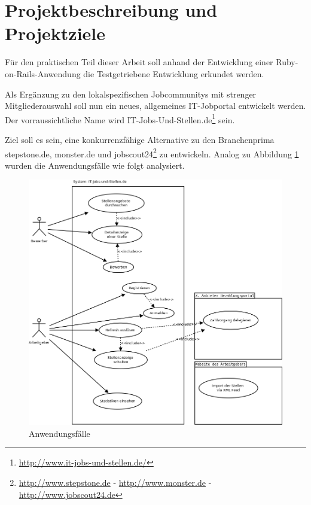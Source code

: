 \section{Projektbeschreibung und Projektziele}
Für den praktischen Teil dieser Arbeit soll anhand der Entwicklung einer Ruby-on-Rails-Anwendung die Testgetriebene Entwicklung erkundet werden.

Als Ergänzung zu den lokalspezifischen Jobcommunitys mit strenger Mitgliederauswahl soll nun ein neues, allgemeines IT-Jobportal entwickelt werden. Der vorraussichtliche Name wird IT-Jobs-Und-Stellen.de\footnote{\url{http://www.it-jobs-und-stellen.de/}} sein.

Ziel soll es sein, eine konkurrenzfähige Alternative zu den Branchenprima stepstone.de, monster.de und jobscout24\footnote{\url{http://www.stepstone.de} - \url{http://www.monster.de} - \url{http://www.jobscout24.de}} zu entwickeln. Analog zu Abbildung \ref{fig:usecases} wurden die Anwendungsfälle wie folgt analysiert.


\begin{figure}[htbp]
 \centering
 \includegraphics[width=1\textwidth]{./material/usecases.png}
 \caption{Anwendungsfälle}
 \label{fig:usecases}
\end{figure}



